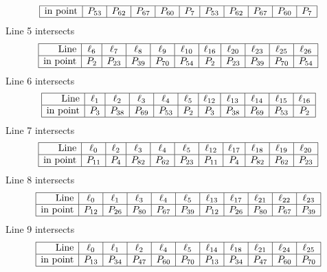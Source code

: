 \documentclass{article}
\begin{document}
{$$\begin{array}{|r*{10}{|c}|}
\hline
\mbox{in point}  & P_{53} & P_{62} & P_{67} & P_{60} & P_{7} & P_{53} & P_{62} & P_{67} & P_{60} & P_{7}\\
\hline
\end{array}
$$
Line 5 intersects 
$$
\begin{array}{|r*{10}{|c}|}
\hline
\mbox{Line}  & \ell_{6} & \ell_{7} & \ell_{8} & \ell_{9} & \ell_{10} & \ell_{16} & \ell_{20} & \ell_{23} & \ell_{25} & \ell_{26}\\
\hline
\mbox{in point}  & P_{2} & P_{23} & P_{39} & P_{70} & P_{54} & P_{2} & P_{23} & P_{39} & P_{70} & P_{54}\\
\hline
\end{array}
$$
Line 6 intersects 
$$
\begin{array}{|r*{10}{|c}|}
\hline
\mbox{Line}  & \ell_{1} & \ell_{2} & \ell_{3} & \ell_{4} & \ell_{5} & \ell_{12} & \ell_{13} & \ell_{14} & \ell_{15} & \ell_{16}\\
\hline
\mbox{in point}  & P_{3} & P_{38} & P_{69} & P_{53} & P_{2} & P_{3} & P_{38} & P_{69} & P_{53} & P_{2}\\
\hline
\end{array}
$$
Line 7 intersects 
$$
\begin{array}{|r*{10}{|c}|}
\hline
\mbox{Line}  & \ell_{0} & \ell_{2} & \ell_{3} & \ell_{4} & \ell_{5} & \ell_{12} & \ell_{17} & \ell_{18} & \ell_{19} & \ell_{20}\\
\hline
\mbox{in point}  & P_{11} & P_{4} & P_{82} & P_{62} & P_{23} & P_{11} & P_{4} & P_{82} & P_{62} & P_{23}\\
\hline
\end{array}
$$
Line 8 intersects 
$$
\begin{array}{|r*{10}{|c}|}
\hline
\mbox{Line}  & \ell_{0} & \ell_{1} & \ell_{3} & \ell_{4} & \ell_{5} & \ell_{13} & \ell_{17} & \ell_{21} & \ell_{22} & \ell_{23}\\
\hline
\mbox{in point}  & P_{12} & P_{26} & P_{80} & P_{67} & P_{39} & P_{12} & P_{26} & P_{80} & P_{67} & P_{39}\\
\hline
\end{array}
$$
Line 9 intersects 
$$
\begin{array}{|r*{10}{|c}|}
\hline
\mbox{Line}  & \ell_{0} & \ell_{1} & \ell_{2} & \ell_{4} & \ell_{5} & \ell_{14} & \ell_{18} & \ell_{21} & \ell_{24} & \ell_{25}\\
\hline
\mbox{in point}  & P_{13} & P_{34} & P_{47} & P_{60} & P_{70} & P_{13} & P_{34} & P_{47} & P_{60} & P_{70}\\
\hline
\end{array}
$$}
\end{document}
